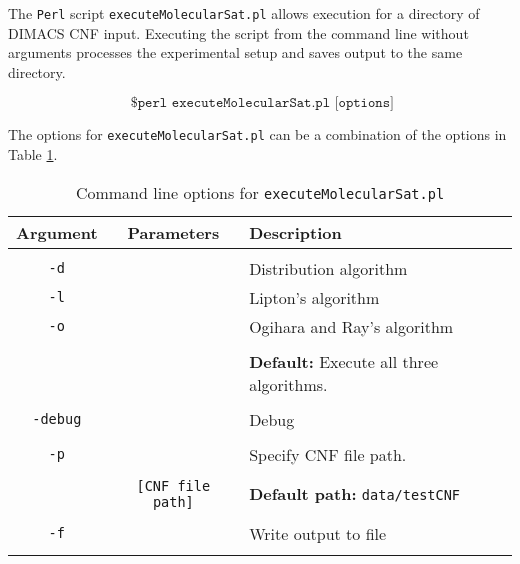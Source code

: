 The \texttt{Perl} script \texttt{executeMolecularSat.pl} allows execution for a directory of DIMACS CNF input.  Executing the script from the command line without arguments processes the experimental setup and saves output to the same directory.

\[
\texttt{ \$ perl executeMolecularSat.pl [options]}
\]

The options for \texttt{executeMolecularSat.pl} can be a combination of the options in Table \ref{executeMolecularSatTable}.

\begin{table}[htdp]
\caption{Command line options for \texttt{executeMolecularSat.pl}}
\begin{center}
\begin{tabular}{|c|c|l|}
\hline
\textbf{Argument} & \textbf{Parameters} & \textbf{Description} \\ \hline
 				&				   &		 \\
 \texttt{-d}	& 				   & Distribution algorithm		 \\
 \texttt{-l}	& 				   & Lipton's algorithm		 \\
 \texttt{-o}	& 				   & Ogihara and Ray's algorithm		 \\
 				&				   &		 \\  				
 				&				   & \textbf{Default:} Execute all three algorithms.		 \\  				
 				&				   &		 \\ \hline 				
\texttt{-debug}		&				   & Debug		 \\ 				
 				&				   &		 \\ \hline
\texttt{-p}		&				   & Specify CNF file path. 	 \\
 				&				   &		 \\  				
 				& \texttt{[CNF file path]}  & \textbf{Default path:} \texttt{data/testCNF}	 \\ 			
 				&				   &		\\ \hline 	
\texttt{-f}		&				   & Write output to file		 \\
 				&				   &		\\ \hline 				
\end{tabular}
\end{center}
\label{executeMolecularSatTable}
\end{table}%

\FloatBarrier


